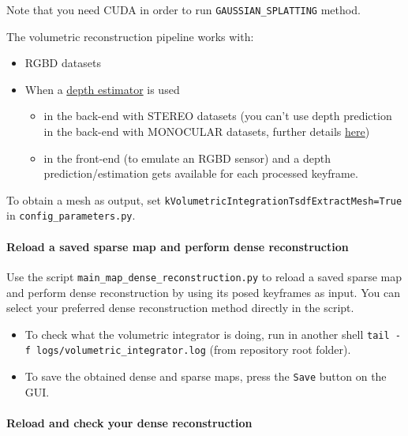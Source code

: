 \documentclass{article}
\providecommand{\tightlist}{%
  \setlength{\itemsep}{0pt}\setlength{\parskip}{0pt}}
\let\oldparagraph\paragraph
\renewcommand{\paragraph}[1]{\oldparagraph{#1}\mbox{}}
\begin{document}
Note that you need CUDA in order to run \texttt{GAUSSIAN\_SPLATTING} method.

The volumetric reconstruction pipeline works with:
\begin{itemize}
\item RGBD datasets 
\item When a \protect\hyperlink{depth-prediction}{depth estimator}
is used
\begin{itemize}
\item[$\circ$] in the back-end with STEREO datasets (you can't use depth
prediction in the back-end with MONOCULAR datasets, further details
\protect\hyperlink{depth-prediction}{here}) 
\item[$\circ$] in the front-end (to emulate an RGBD sensor) and a depth prediction/estimation gets available
for each processed keyframe.
\end{itemize}
\end{itemize}

To obtain a mesh as output, set
\texttt{kVolumetricIntegrationTsdfExtractMesh=True} in
\texttt{config\_parameters.py}.

\hypertarget{reload-a-saved-sparse-map-and-perform-dense-reconstruction}{%
\paragraph{Reload a saved sparse map and perform dense
reconstruction}\label{reload-a-saved-sparse-map-and-perform-dense-reconstruction}}

Use the script \texttt{main\_map\_dense\_reconstruction.py} to reload a
saved sparse map and perform dense reconstruction by using its posed
keyframes as input. You can select your preferred dense reconstruction
method directly in the script.

\begin{itemize}
\tightlist
\item
  To check what the volumetric integrator is doing, run in another shell
  \texttt{tail\ -f\ logs/volumetric\_integrator.log} (from repository
  root folder).
\item
  To save the obtained dense and sparse maps, press the \texttt{Save}
  button on the GUI.
\end{itemize}

\hypertarget{reload-and-check-your-dense-reconstruction}{%
\paragraph{Reload and check your dense
reconstruction}\label{reload-and-check-your-dense-reconstruction}}
\end{document}
